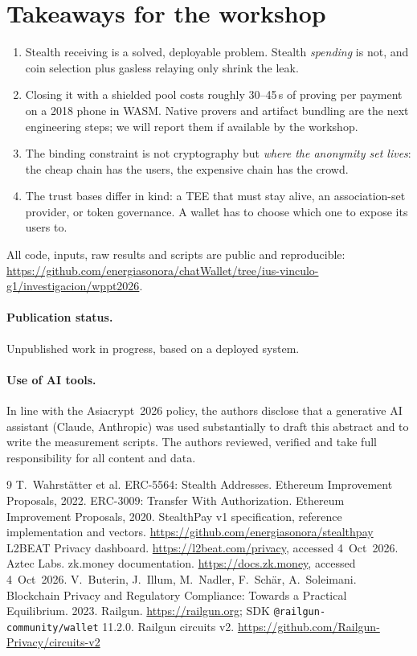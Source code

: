 \documentclass[10pt]{article}
\begin{document}
\section*{Takeaways for the workshop}
\begin{enumerate}\setlength\itemsep{0em}
\item Stealth receiving is a solved, deployable problem. Stealth \emph{spending} is not, and coin selection plus gasless relaying only shrink the leak.
\item Closing it with a shielded pool costs roughly 30--45\,s of proving per payment on a 2018 phone in WASM. Native provers and artifact bundling are the next engineering steps; we will report them if available by the workshop.
\item The binding constraint is not cryptography but \emph{where the anonymity set lives}: the cheap chain has the users, the expensive chain has the crowd.
\item The trust bases differ in kind: a TEE that must stay alive, an association-set provider, or token governance. A wallet has to choose which one to expose its users to.
\end{enumerate}
All code, inputs, raw results and scripts are public and reproducible:
\url{https://github.com/energiasonora/chatWallet/tree/ius-vinculo-g1/investigacion/wppt2026}.

\paragraph{Publication status.} Unpublished work in progress, based on a deployed system.

\paragraph{Use of AI tools.} In line with the Asiacrypt~2026 policy, the authors disclose
that a generative AI assistant (Claude, Anthropic) was used substantially to draft this
abstract and to write the measurement scripts. The authors reviewed, verified and take full
responsibility for all content and data.

\begin{thebibliography}{9}\small\setlength\itemsep{0em}
 T.~Wahrstätter et al. ERC-5564: Stealth Addresses. Ethereum Improvement Proposals, 2022.
 ERC-3009: Transfer With Authorization. Ethereum Improvement Proposals, 2020.
 StealthPay v1 specification, reference implementation and vectors. \url{https://github.com/energiasonora/stealthpay}
 L2BEAT Privacy dashboard. \url{https://l2beat.com/privacy}, accessed 4~Oct~2026.
 Aztec Labs. zk.money documentation. \url{https://docs.zk.money}, accessed 4~Oct~2026.
 V.~Buterin, J.~Illum, M.~Nadler, F.~Schär, A.~Soleimani. Blockchain Privacy and Regulatory Compliance: Towards a Practical Equilibrium. 2023.
 Railgun. \url{https://railgun.org}; SDK \texttt{@railgun-community/wallet} 11.2.0.
 Railgun circuits v2. \url{https://github.com/Railgun-Privacy/circuits-v2}
\end{thebibliography}
\end{document}
